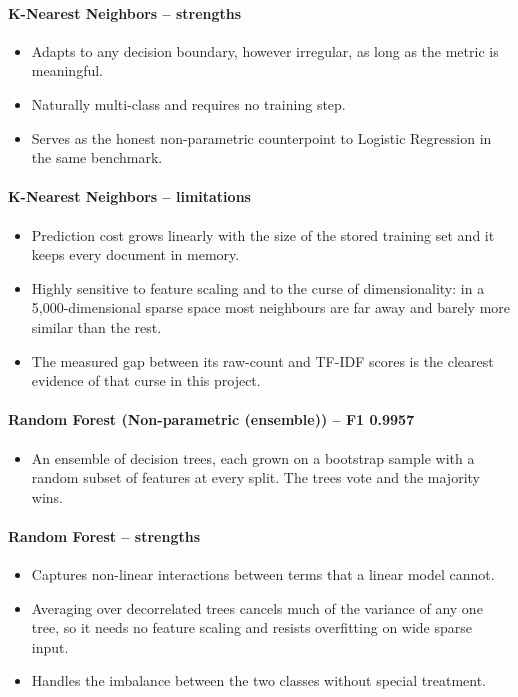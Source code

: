 \documentclass[conference,a4paper]{IEEEtran}
\begin{document}
\paragraph{K-Nearest Neighbors -- strengths}

\begin{itemize}
  \item Adapts to any decision boundary, however irregular, as long as the metric is meaningful.
  \item Naturally multi-class and requires no training step.
  \item Serves as the honest non-parametric counterpoint to Logistic Regression in the same benchmark.
\end{itemize}

\paragraph{K-Nearest Neighbors -- limitations}

\begin{itemize}
  \item Prediction cost grows linearly with the size of the stored training set and it keeps every document in memory.
  \item Highly sensitive to feature scaling and to the curse of dimensionality: in a 5,000-dimensional sparse space most neighbours are far away and barely more similar than the rest.
  \item The measured gap between its raw-count and TF-IDF scores is the clearest evidence of that curse in this project.
\end{itemize}

\paragraph{Random Forest (Non-parametric (ensemble)) -- F1 0.9957}

\begin{itemize}
  \item An ensemble of decision trees, each grown on a bootstrap sample with a random subset of features at every split. The trees vote and the majority wins.
\end{itemize}

\paragraph{Random Forest -- strengths}

\begin{itemize}
  \item Captures non-linear interactions between terms that a linear model cannot.
  \item Averaging over decorrelated trees cancels much of the variance of any one tree, so it needs no feature scaling and resists overfitting on wide sparse input.
  \item Handles the imbalance between the two classes without special treatment.
\end{itemize}
\end{document}
